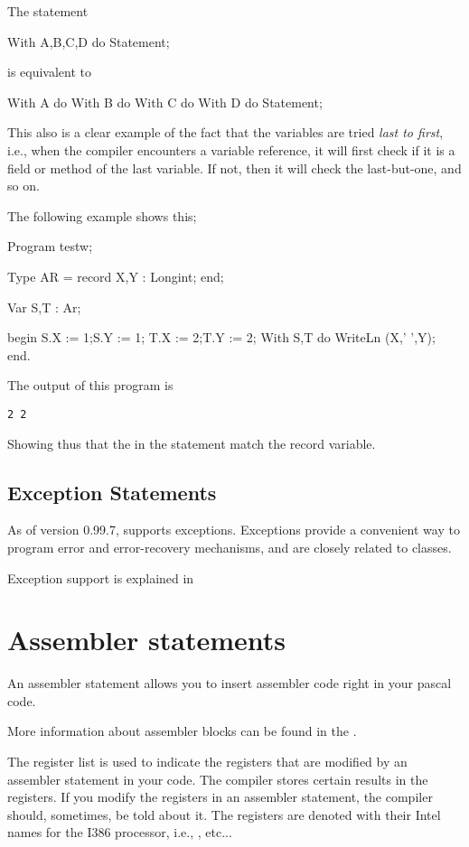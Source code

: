 \documentclass{report}
\begin{document}
The statement
\begin{listing}
With A,B,C,D do Statement;
\end{listing}
is equivalent to
\begin{listing}
With A do
 With B do
  With C do
   With D do Statement;
\end{listing}
This also is a clear example of the fact that the variables are tried {\em last
to first}, i.e., when the compiler encounters a variable reference, it will
first check if it is a field or method of the last variable. If not, then it
will check the last-but-one, and so on.  

The following example shows this;
\begin{listing}
Program testw;

Type AR = record
      X,Y : Longint;
     end;
     
Var S,T : Ar;

begin
  S.X := 1;S.Y := 1;
  T.X := 2;T.Y := 2;
  With S,T do 
    WriteLn (X,' ',Y);
end.     
\end{listing}
The output of this program is
\begin{verbatim}
2 2
\end{verbatim}
Showing thus that the  in the  statement match the 
 record variable.

\subsection{Exception Statements}

As of version 0.99.7, \fpc supports exceptions. Exceptions provide a
convenient way to program error and error-recovery mechanisms, and are
closely related to classes. 

Exception support is explained in 

\section{Assembler statements}

An assembler statement allows you to insert assembler code right in your
pascal code.



More information about assembler blocks can be found in the \progref.

The register list is used to indicate the registers that are modified by an
assembler statement in your code. The compiler stores certain results in the
registers. If you modify the registers in an assembler statement, the compiler
should, sometimes, be told about it. The registers are denoted with their
Intel names for the I386 processor, i.e., ,  etc...
\end{document}
